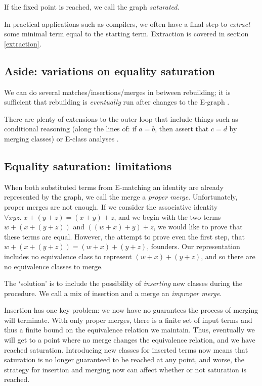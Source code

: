 \documentclass[12pt,a4paper,twoside,openright]{report}
\numberwithin{equation}{chapter}		%
\numberwithin{figure}{chapter}			%
\numberwithin{table}{chapter}			%
\theoremstyle{definition}
\theoremstyle{plain}
\begin{document}
If the fixed point is reached, we call the graph \emph{saturated}.

In practical applications such as compilers, we often have a final step to \emph{extract} some minimal term equal to the starting term. Extraction is covered in section \ref{extraction}.

\subsection{Aside: variations on equality saturation}
We can do several matches/insertions/merges in between rebuilding; it is sufficient that rebuilding is \emph{eventually} run after changes to the E-graph \citep{willsey_egg_2021}.

There are plenty of extensions to the outer loop that include things such as conditional reasoning (along the lines of: if $a = b$, then assert that $c = d$ by merging classes) or E-class analyses \cite{willsey_egg_2021}.

\subsection{Equality saturation: limitations}
When both substituted terms from E-matching an identity are already represented by the graph, we call the merge a \emph{proper merge}. Unfortunately, proper merges are not enough. If we consider the associative identity $\forall x y z.\; x + (y + z) = (x + y) + z$, and we begin with the two terms $w + (x + (y + z))$ and $((w + x) + y) + z$, we would like to prove that these terms are equal. However, the attempt to prove even the first step, that $w + (x + (y + z)) = (w + x) + (y + z)$, founders. Our representation includes no equivalence class to represent $(w + x) + (y + z)$, and so there are no equivalence classes to merge.

The `solution' is to include the possibility of \emph{inserting} new classes during the procedure. We call a mix of insertion and a merge an \emph{improper merge}.

Insertion has one key problem: we now have no guarantees the process of merging will terminate. With only proper merges, there is a finite set of input terms and thus a finite bound on the equivalence relation we maintain. Thus, eventually we will get to a point where no merge changes the equivalence relation, and we have reached saturation. Introducing new classes for inserted terms now means that saturation is no longer guaranteed to be reached at any point, and worse, the strategy for insertion and merging now can affect whether or not saturation is reached.
\end{document}
